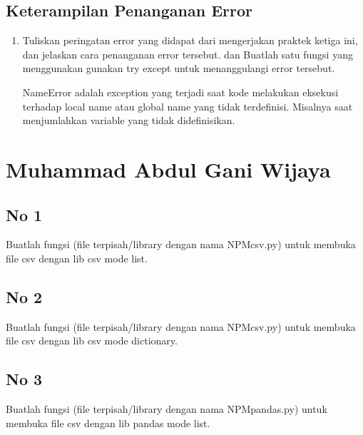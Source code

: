 \subsection{Keterampilan Penanganan Error}

\begin{enumerate}
	\item Tuliskan peringatan error yang didapat dari mengerjakan praktek ketiga ini,
dan jelaskan cara penanganan error tersebut. dan Buatlah satu fungsi yang
menggunakan gunakan try except untuk menanggulangi error tersebut.
	
	\par NameError adalah exception yang terjadi saat kode melakukan eksekusi terhadap local name atau global name yang tidak terdefinisi. Misalnya saat menjumlahkan variable yang tidak didefinisikan.
	
\end{enumerate}



\section{Muhammad Abdul Gani Wijaya}
\subsection{No 1}
Buatlah  fungsi  (file  terpisah/library  dengan  nama  NPMcsv.py)  untuk  membuka file csv dengan lib csv mode list.



\subsection{No 2}
Buatlah  fungsi  (file  terpisah/library  dengan  nama  NPMcsv.py)  untuk  membuka file csv dengan lib csv mode dictionary.



\subsection{No 3}
Buatlah fungsi (file terpisah/library dengan nama NPMpandas.py) untuk membuka file csv dengan lib pandas mode list.

